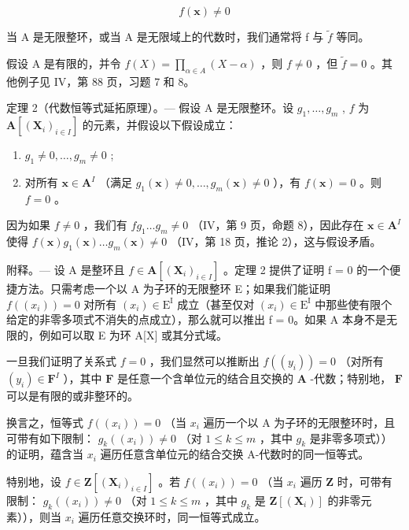 \[
f (\mathbf {x}) \neq 0
\]

当 A 是无限整环，或当 A 是无限域上的代数时，我们通常将 f 与 \(\tilde{f}\) 等同。

假设 A 是有限的，并令 \(f(X) = \prod_{\alpha \in A} (X - \alpha)\) ，则 \(f \neq 0\) ，但 \(\tilde{f} = 0\) 。其他例子见 IV，第 88 页，习题 7 和 8。

定理 2（代数恒等式延拓原理）。--- 假设 A 是无限整环。设 \(g_1, \ldots, g_m\) , \(f\) 为 \(\mathbf{A}[(\mathbf{X}_i)_{i \in I}]\) 的元素，并假设以下假设成立：

\begin{enumerate}
\def\labelenumi{\alph{enumi})}
\item
  \(g_{1} \neq 0, \ldots, g_{m} \neq 0\) ;
\item
  对所有 \(\mathbf{x} \in \mathbf{A}^{I}\) （满足 \(g_1(\mathbf{x}) \neq 0, \ldots, g_m(\mathbf{x}) \neq 0\) ），有 \(f(\mathbf{x}) = 0\) 。则 \(f = 0\) 。
\end{enumerate}

因为如果 \(f \neq 0\) ，我们有 \(fg_1 \ldots g_m \neq 0\) （IV，第 9 页，命题 8），因此存在 \(\mathbf{x} \in \mathbf{A}^{I}\) 使得 \(f(\mathbf{x})g_1(\mathbf{x}) \ldots g_m(\mathbf{x}) \neq 0\) （IV，第 18 页，推论 2），这与假设矛盾。

附释。--- 设 A 是整环且 \(f \in \mathbf{A}[(\mathbf{X}_i)_{i \in I}]\) 。定理 2 提供了证明 f = 0 的一个便捷方法。只需考虑一个以 A 为子环的无限整环 E；如果我们能证明 \(f((x_i)) = 0\) 对所有 \((x_i) \in \mathrm{E}^{\mathrm{I}}\) 成立（甚至仅对 \((x_i) \in \mathrm{E}^{\mathrm{I}}\) 中那些使有限个给定的非零多项式不消失的点成立），那么就可以推出 f = 0。如果 A 本身不是无限的，例如可以取 E 为环 A{[}X{]} 或其分式域。

一旦我们证明了关系式 \(f = 0\) ，我们显然可以推断出 \(f((y_i)) = 0\) （对所有 \((y_i) \in \mathbf{F}^{I}\) ），其中 \(\mathbf{F}\) 是任意一个含单位元的结合且交换的 \(\mathbf{A}\) -代数；特别地， \(\mathbf{F}\) 可以是有限的或非整环的。

换言之，恒等式 \(f((x_{i})) = 0\) （当 \(x_{i}\) 遍历一个以 A 为子环的无限整环时，且可带有如下限制： \(g_{k}((x_{i})) \neq 0\) （对 \(1 \leqslant k \leqslant m\) ，其中 \(g_{k}\) 是非零多项式））的证明，蕴含当 \(x_{i}\) 遍历任意含单位元的结合交换 A-代数时的同一恒等式。

特别地，设 \(f \in \mathbf{Z}[(\mathbf{X}_i)_{i \in I}]\) 。若 \(f((x_i)) = 0\) （当 \(x_i\) 遍历 \(\mathbf{Z}\) 时，可带有限制： \(g_k((x_i)) \neq 0\) （对 \(1 \leqslant k \leqslant m\) ，其中 \(g_k\) 是 \(\mathbf{Z}[(\mathbf{X}_i)]\) 的非零元素）），则当 \(x_i\) 遍历任意交换环时，同一恒等式成立。

